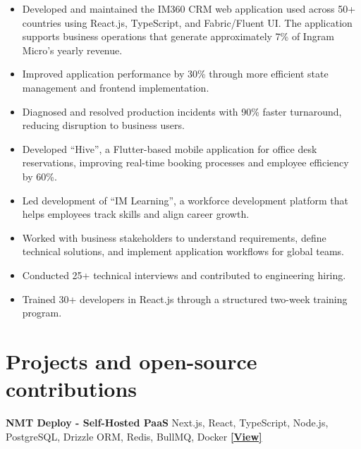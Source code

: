 \documentclass[10pt,a4paper]{article}
\newcommand{\projectEntry}[3]{
    \textbf{#1} \hfill #2 \quad
    \href{#3}{\textbf{[View]}}
}
\begin{document}
\begin{itemize}
    \item Developed and maintained the IM360 CRM web application used across 50+ countries using React.js, TypeScript, and Fabric/Fluent UI. The application supports business operations that generate approximately 7\% of Ingram Micro's yearly revenue.
    
    \item Improved application performance by 30\% through more efficient state management and frontend implementation.
    
    \item Diagnosed and resolved production incidents with 90\% faster turnaround, reducing disruption to business users.
    
    \item Developed ``Hive'', a Flutter-based mobile application for office desk reservations, improving real-time booking processes and employee efficiency by 60\%.
    
    \item Led development of ``IM Learning'', a workforce development platform that helps employees track skills and align career growth.
    
    \item Worked with business stakeholders to understand requirements, define technical solutions, and implement application workflows for global teams.
    
    \item Conducted 25+ technical interviews and contributed to engineering hiring.
    
    \item Trained 30+ developers in React.js through a structured two-week training program.
\end{itemize}

\section{Projects and open-source contributions}


\projectEntry
{NMT Deploy - Self-Hosted PaaS}
{Next.js, React, TypeScript, Node.js, PostgreSQL, Drizzle ORM, Redis, BullMQ, Docker}
{https://deploy.nmtsolutions.in/}
\end{document}
